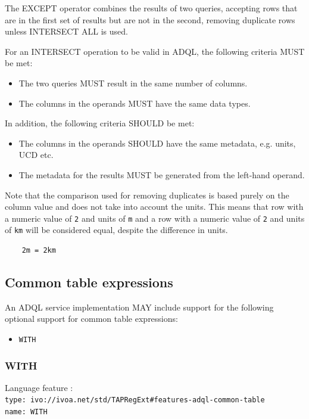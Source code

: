 \documentclass[11pt,a4paper]{ivoa}
\begin{document}
The EXCEPT operator combines the results of two queries, accepting rows that are
in the first set of results but are not in the second,
removing duplicate rows unless INTERSECT ALL is used.

For an INTERSECT operation to be valid in ADQL, the following criteria MUST be met:

\begin{itemize}
    \item The two queries MUST result in the same number of columns.
    \item The columns in the operands MUST have the same data types.
\end{itemize}

In addition, the following criteria SHOULD be met: 
\begin{itemize}
    \item The columns in the operands SHOULD have the same metadata, e.g. units, UCD etc.
    \item The metadata for the results MUST be generated from the left-hand operand.
\end{itemize}

Note that the comparison used for removing duplicates is based purely on the
column value and does not take into account the units.
This means that row with a numeric value of \verb:2: and units of \verb:m:
and a row with a numeric value of \verb:2: and units of \verb:km: will be
considered equal, despite the difference in units.
\begin{verbatim}
    2m = 2km
\end{verbatim}

\subsection{Common table expressions}
\label{sec:common-table}

An ADQL service implementation MAY include support for the following optional
support for common table expressions:

\begin{itemize}
    \item \verb:WITH:
\end{itemize}

\subsubsection{WITH}
{\footnotesize Language feature :}\\
{\footnotesize \verb|type: ivo://ivoa.net/std/TAPRegExt#features-adql-common-table|}\\
{\footnotesize \verb|name: WITH|}\\
\end{document}
